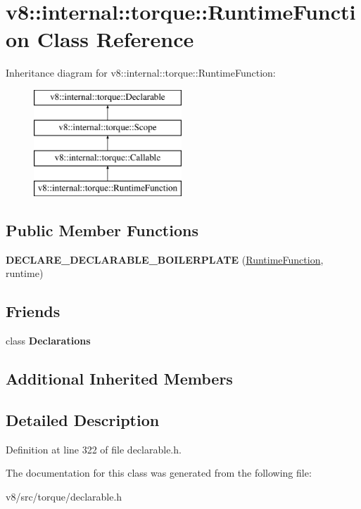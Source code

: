 \hypertarget{classv8_1_1internal_1_1torque_1_1RuntimeFunction}{}\section{v8\+:\+:internal\+:\+:torque\+:\+:Runtime\+Function Class Reference}
\label{classv8_1_1internal_1_1torque_1_1RuntimeFunction}
Inheritance diagram for v8\+:\+:internal\+:\+:torque\+:\+:Runtime\+Function\+:\begin{figure}[H]
\begin{center}
\leavevmode
\includegraphics[height=4.000000cm]{classv8_1_1internal_1_1torque_1_1RuntimeFunction}
\end{center}
\end{figure}
\subsection*{Public Member Functions}
\begin{DoxyCompactItemize}
\item 
\mbox{\label{classv8_1_1internal_1_1torque_1_1RuntimeFunction_a46c5ab921491560e1fb5c4d90dfc41b6}} 
{\bfseries D\+E\+C\+L\+A\+R\+E\+\_\+\+D\+E\+C\+L\+A\+R\+A\+B\+L\+E\+\_\+\+B\+O\+I\+L\+E\+R\+P\+L\+A\+TE} (\mbox{\hyperlink{classv8_1_1internal_1_1torque_1_1RuntimeFunction}{Runtime\+Function}}, runtime)
\end{DoxyCompactItemize}
\subsection*{Friends}
\begin{DoxyCompactItemize}
\item 
\mbox{\label{classv8_1_1internal_1_1torque_1_1RuntimeFunction_a23135931a5f054329315374b774718cf}} 
class {\bfseries Declarations}
\end{DoxyCompactItemize}
\subsection*{Additional Inherited Members}


\subsection{Detailed Description}


Definition at line 322 of file declarable.\+h.



The documentation for this class was generated from the following file\+:\begin{DoxyCompactItemize}
\item 
v8/src/torque/declarable.\+h\end{DoxyCompactItemize}
